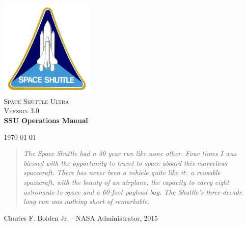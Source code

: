 \documentclass[13pt]{article}
\begin{document}
\begin{titlepage}

\begin{center}

\includegraphics[width=0.35\textwidth]{SSP.jpg}\\[1cm]

\textsc{\LARGE Space Shuttle Ultra}\\[1.5cm]

\textsc{\Large Version 3.0}\\[0.5cm]

\huge \bfseries SSU Operations Manual\\[0.4cm]

\vfill

{\large \today}

\end{center}
\end{titlepage}


\newpage
\thispagestyle{empty}
\vspace*{\fill}
\begin{quote}
\centering
\textit{The Space Shuttle had a 30 year run like none other. Four times I was blessed with the opportunity to travel to space aboard this marvelous spacecraft. There has never been a vehicle quite like it$\colon$ a reusable spacecraft, with the beauty of an airplane, the capacity to carry eight astronauts to space and a 60-foot payload bay. The Shuttle's three-decade long run was nothing short of remarkable.}
\end{quote}
\begin{flushright}
Charles F. Bolden Jr. - NASA Administrator, 2015
\end{flushright}
\vspace*{\fill}
\newpage


\end{document}
